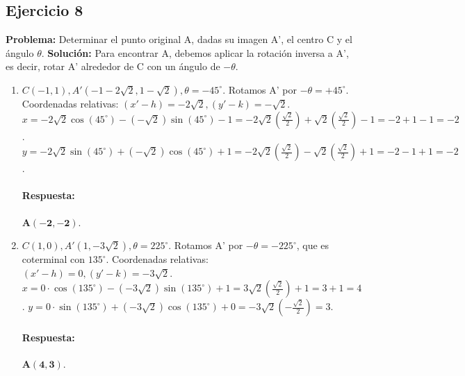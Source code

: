 \documentclass[12pt, letterpaper]{article}
\begin{document}
\subsection{Ejercicio 8}
\textbf{Problema:} Determinar el punto original A, dadas su imagen A', el centro C y el ángulo $\theta$.
\textbf{Solución:} Para encontrar A, debemos aplicar la rotación inversa a A', es decir, rotar A' alrededor de C con un ángulo de $-\theta$.
\begin{enumerate}[label=\alph*)]
    \item $C(-1,1), A'(-1-2\sqrt{2}, 1-\sqrt{2}), \theta=-45^\circ$. Rotamos A' por $-\theta = +45^\circ$.
    Coordenadas relativas: $(x'-h)=-2\sqrt{2}, (y'-k)=-\sqrt{2}$.
    $x = -2\sqrt{2}\cos(45^\circ) - (-\sqrt{2})\sin(45^\circ) - 1 = -2\sqrt{2}(\frac{\sqrt{2}}{2}) + \sqrt{2}(\frac{\sqrt{2}}{2}) - 1 = -2+1-1 = -2$.
    $y = -2\sqrt{2}\sin(45^\circ) + (-\sqrt{2})\cos(45^\circ) + 1 = -2\sqrt{2}(\frac{\sqrt{2}}{2}) - \sqrt{2}(\frac{\sqrt{2}}{2}) + 1 = -2-1+1 = -2$.
    \paragraph{Respuesta:} $\mathbf{A(-2,-2)}$.
    
    \item $C(1,0), A'(1,-3\sqrt{2}), \theta=225^\circ$. Rotamos A' por $-\theta = -225^\circ$, que es coterminal con $135^\circ$.
    Coordenadas relativas: $(x'-h)=0, (y'-k)=-3\sqrt{2}$.
    $x = 0\cdot\cos(135^\circ) - (-3\sqrt{2})\sin(135^\circ) + 1 = 3\sqrt{2}(\frac{\sqrt{2}}{2}) + 1 = 3+1 = 4$.
    $y = 0\cdot\sin(135^\circ) + (-3\sqrt{2})\cos(135^\circ) + 0 = -3\sqrt{2}(-\frac{\sqrt{2}}{2}) = 3$.
    \paragraph{Respuesta:} $\mathbf{A(4,3)}$.
\end{enumerate}
\end{document}
